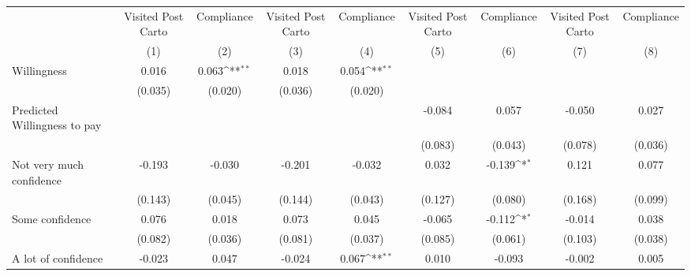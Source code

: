 {
\def\sym#1{\ifmmode^{#1}\else\(^{#1}\)\fi}
\begin{tabular}{l*{8}{c}}
\hline\hline
                &\multicolumn{1}{c}{Visited Post Carto}&\multicolumn{1}{c}{Compliance}&\multicolumn{1}{c}{Visited Post Carto}&\multicolumn{1}{c}{Compliance}&\multicolumn{1}{c}{Visited Post Carto}&\multicolumn{1}{c}{Compliance}&\multicolumn{1}{c}{Visited Post Carto}&\multicolumn{1}{c}{Compliance}\\
                &\multicolumn{1}{c}{(1)}         &\multicolumn{1}{c}{(2)}         &\multicolumn{1}{c}{(3)}         &\multicolumn{1}{c}{(4)}         &\multicolumn{1}{c}{(5)}         &\multicolumn{1}{c}{(6)}         &\multicolumn{1}{c}{(7)}         &\multicolumn{1}{c}{(8)}         \\
\hline
Willingness     &    0.016         &    0.063\sym{**} &    0.018         &    0.054\sym{**} &                  &                  &                  &                  \\
                &  (0.035)         &  (0.020)         &  (0.036)         &  (0.020)         &                  &                  &                  &                  \\
Predicted Willingness to pay&                  &                  &                  &                  &   -0.084         &    0.057         &   -0.050         &    0.027         \\
                &                  &                  &                  &                  &  (0.083)         &  (0.043)         &  (0.078)         &  (0.036)         \\
Not very much confidence&   -0.193         &   -0.030         &   -0.201         &   -0.032         &    0.032         &   -0.139\sym{*}  &    0.121         &    0.077         \\
                &  (0.143)         &  (0.045)         &  (0.144)         &  (0.043)         &  (0.127)         &  (0.080)         &  (0.168)         &  (0.099)         \\
Some confidence &    0.076         &    0.018         &    0.073         &    0.045         &   -0.065         &   -0.112\sym{*}  &   -0.014         &    0.038         \\
                &  (0.082)         &  (0.036)         &  (0.081)         &  (0.037)         &  (0.085)         &  (0.061)         &  (0.103)         &  (0.038)         \\
A lot of confidence&   -0.023         &    0.047         &   -0.024         &    0.067\sym{**} &    0.010         &   -0.093         &   -0.002         &    0.005         \\

\end{tabular}}
